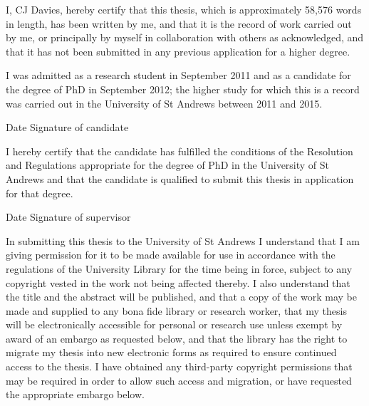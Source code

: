 

I, CJ Davies, hereby certify that this thesis, which is approximately 58,576 words in length, has been written by me, and that it is the record of work carried out by me, or principally by myself in collaboration with others as acknowledged, and that it has not been submitted in any previous application for a higher degree. 

I was admitted as a research student in September 2011 and as a candidate for the degree of PhD in September 2012; the higher study for which this is a record was carried out in the University of St Andrews between 2011 and 2015. 

\vspace{5mm}

Date \hspace{35mm} Signature of candidate

\vspace{10mm}



I hereby certify that the candidate has fulfilled the conditions of the Resolution and Regulations appropriate for the degree of PhD in the University of St Andrews and that the candidate is qualified to submit this thesis in application for that degree. 

\vspace{5mm}

Date \hspace{35mm} Signature of supervisor

\vspace{10mm}



In submitting this thesis to the University of St Andrews I understand that I am giving permission for it to be made available for use in accordance with the regulations of the University Library for the time being in force, subject to any copyright vested in the work not being affected thereby.  I also understand that the title and the abstract will be published, and that a copy of the work may be made and supplied to any bona fide library or research worker, that my thesis will be electronically accessible for personal or research use unless exempt by award of an embargo as requested below, and that the library has the right to migrate my thesis into new electronic forms as required to ensure continued access to the thesis. I have obtained any third-party copyright permissions that may be required in order to allow such access and migration, or have requested the appropriate embargo below. 

